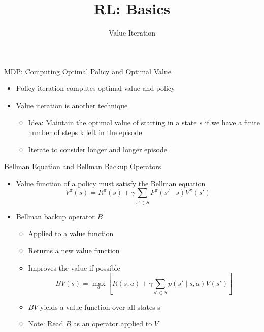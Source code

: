 \documentclass[aspectratio=169]{../latex_main/tntbeamer}  %
\title[Reinforcement Learning: Basics]{RL: Basics}
\subtitle{Value Iteration}
\begin{document}
	
	\maketitle

\begin{frame}[c]{MDP: Computing Optimal Policy and Optimal Value}

\begin{itemize}
	\item Policy iteration computes optimal value and policy
	\item Value iteration is another technique
	\begin{itemize}
		\item Idea: Maintain the optimal value of starting in a state $s$ if we have a finite 	number of steps k left in the episode
		\item Iterate to consider longer and longer episode
	\end{itemize}

\end{itemize}

\end{frame}
\begin{frame}[c]{Bellman Equation and Bellman Backup Operators}

\begin{itemize}
	\item Value function of a policy must satisfy the Bellman equation
	$$V^\pi (s) = R^\pi (s) + \gamma \sum_{s' \in S}  P^\pi(s' \mid s ) V^\pi (s') $$
	\item Bellman backup operator $B$
	\begin{itemize}
		\item Applied to a value function
		 \item 	Returns a new value function
		 \item 	Improves the value if possible
		 $$ BV(s) = \max_{a} [ R(s,a) + \gamma \sum_{s' \in S} p(s' \mid s,a)  V(s')  ]$$
		 \item $BV$ yields a value function over all states s
		 \item Note: Read $B$ as an operator applied to $V$
	\end{itemize}
	
\end{itemize}

\end{frame}
\end{document}
